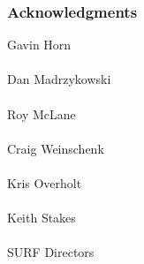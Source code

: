 \documentclass[t]{beamer}
\begin{document}
\begin{frame}
\frametitle{Acknowledgments}
Gavin Horn
\\~\\
Dan Madrzykowski
\\~\\
Roy McLane
\\~\\
Craig Weinschenk
\\~\\
Kris Overholt
\\~\\
Keith Stakes
\\~\\
SURF Directors
\end{frame}


\end{document}
